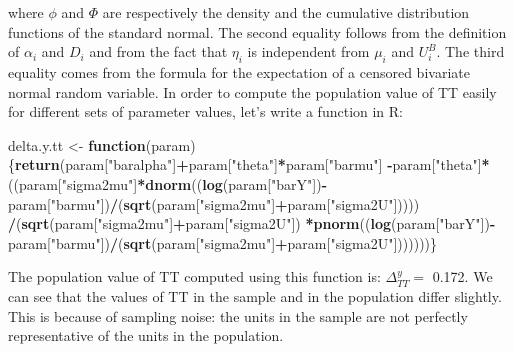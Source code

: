 \documentclass[]{book}
\newenvironment{Shaded}{\begin{snugshade}}{\end{snugshade}}
\newcommand{\KeywordTok}[1]{\textcolor[rgb]{0.13,0.29,0.53}{\textbf{#1}}}
\newcommand{\StringTok}[1]{\textcolor[rgb]{0.31,0.60,0.02}{#1}}
\newcommand{\ControlFlowTok}[1]{\textcolor[rgb]{0.13,0.29,0.53}{\textbf{#1}}}
\newcommand{\OperatorTok}[1]{\textcolor[rgb]{0.81,0.36,0.00}{\textbf{#1}}}
\newcommand{\NormalTok}[1]{#1}
\theoremstyle{definition}
\theoremstyle{definition}
\theoremstyle{definition}
\theoremstyle{remark}
\begin{document}
where \(\phi\) and \(\Phi\) are respectively the density and the
cumulative distribution functions of the standard normal. The second
equality follows from the definition of \(\alpha_i\) and \(D_i\) and
from the fact that \(\eta_i\) is independent from \(\mu_i\) and
\(U_i^B\). The third equality comes from the formula for the expectation
of a censored bivariate normal random variable. In order to compute the
population value of TT easily for different sets of parameter values,
let's write a function in R:

\begin{Shaded}
\begin{Highlighting}[]
\NormalTok{delta.y.tt <-}\StringTok{ }\ControlFlowTok{function}\NormalTok{(param)\{}\KeywordTok{return}\NormalTok{(param[}\StringTok{"baralpha"}\NormalTok{]}\OperatorTok{+}\NormalTok{param[}\StringTok{"theta"}\NormalTok{]}\OperatorTok{*}\NormalTok{param[}\StringTok{"barmu"}\NormalTok{]}
                                     \OperatorTok{-}\NormalTok{param[}\StringTok{"theta"}\NormalTok{]}\OperatorTok{*}\NormalTok{((param[}\StringTok{"sigma2mu"}\NormalTok{]}\OperatorTok{*}\KeywordTok{dnorm}\NormalTok{((}\KeywordTok{log}\NormalTok{(param[}\StringTok{"barY"}\NormalTok{])}\OperatorTok{-}\NormalTok{param[}\StringTok{"barmu"}\NormalTok{])}\OperatorTok{/}\NormalTok{(}\KeywordTok{sqrt}\NormalTok{(param[}\StringTok{"sigma2mu"}\NormalTok{]}\OperatorTok{+}\NormalTok{param[}\StringTok{"sigma2U"}\NormalTok{]))))}
                                                      \OperatorTok{/}\NormalTok{(}\KeywordTok{sqrt}\NormalTok{(param[}\StringTok{"sigma2mu"}\NormalTok{]}\OperatorTok{+}\NormalTok{param[}\StringTok{"sigma2U"}\NormalTok{])}
                                                        \OperatorTok{*}\KeywordTok{pnorm}\NormalTok{((}\KeywordTok{log}\NormalTok{(param[}\StringTok{"barY"}\NormalTok{])}\OperatorTok{-}\NormalTok{param[}\StringTok{"barmu"}\NormalTok{])}\OperatorTok{/}\NormalTok{(}\KeywordTok{sqrt}\NormalTok{(param[}\StringTok{"sigma2mu"}\NormalTok{]}\OperatorTok{+}\NormalTok{param[}\StringTok{"sigma2U"}\NormalTok{]))))))\}}
\end{Highlighting}
\end{Shaded}

The population value of TT computed using this function is:
\(\Delta^y_{TT}=\) 0.172. We can see that the values of TT in the sample
and in the population differ slightly. This is because of sampling
noise: the units in the sample are not perfectly representative of the
units in the population.
\end{document}
